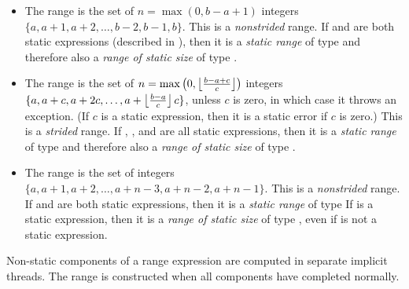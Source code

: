 \begin{itemize}
\item The range  is the set of $n=\max(0,b-a+1)$ integers $\{a, a+1, a+2, \ldots, b-2, b-1, b\}$.
This is a \emph{nonstrided} range.
If  and  are both static expressions
(described in ),
then it is a \emph{static range} of type 
and therefore also a \emph{range of static size} of type .

\item The range  is
the set of $n=\max\left(0, \left\lfloor {b-a+c \over c} \right\rfloor \right)$ integers
$\{a, a+c, a+2c, \ldots, a + \left\lfloor {b-a \over c} \right\rfloor c\}$,
unless $c$ is zero, in which case it throws an exception.
(If $c$ is a static expression, then it is a static error if $c$ is zero.)
This is a \emph{strided} range.
If , , and  are all static expressions,
then it is a \emph{static range} of type 
and therefore also a \emph{range of static size} of type .

\item The range  is the set of
 integers $\{a, a+1, a+2, \ldots, a+n-3, a+n-2, a+n-1\}$.
This is a \emph{nonstrided} range.
If  and  are both static expressions,
then it is a \emph{static range} of type 
If  is a static expression, then it is a \emph{range of static size}
of type ,
even if  is not a static expression.
\end{itemize}

Non-static components of a range expression are computed in separate
implicit threads.  The range is constructed when all components have
completed normally.

